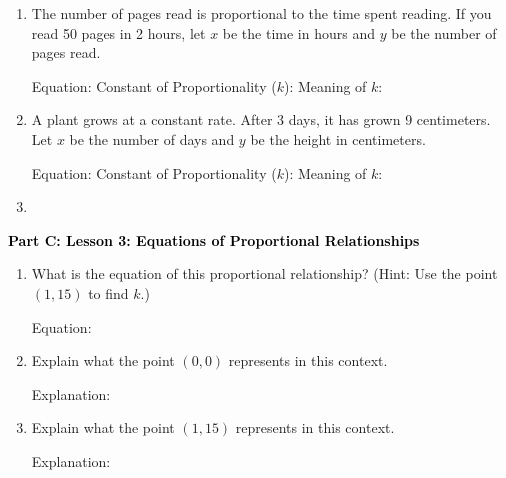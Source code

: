\documentclass[12pt, letterpaper, fleqn]{article}
\newcommand{\blanklong}{\underline{\hspace{6.5cm}}}
\newcommand{\blankshorter}{\underline{\hspace{1.5cm}}}
\begin{document}
\begin{enumerate}[itemsep=5.5cm, leftmargin=0.6cm, resume]
\item The number of pages read is proportional to the time spent reading. If you read 50 pages in 2 hours, let $x$ be the time in hours and $y$ be the number of pages read.
    \begin{tcolorbox}[colback=customteal!10, colframe=customteal!50]
    Equation: \blanklong
    Constant of Proportionality ($k$): \blankshorter
    Meaning of $k$: \blanklong
    \end{tcolorbox}
\item A plant grows at a constant rate. After 3 days, it has grown 9 centimeters. Let $x$ be the number of days and $y$ be the height in centimeters.
    \begin{tcolorbox}[colback=customteal!10, colframe=customteal!50]
    Equation: \blanklong
    Constant of Proportionality ($k$): \blankshorter
    Meaning of $k$: \blanklong
    \end{tcolorbox}
\item [label=\arabic*., itemsep=\fill, leftmargin=0.6cm]
\end{enumerate}

\newpage

\begin{tcolorbox}[colback=customteal!20]
\large\textcolor{black}{\textbf{Part C: Lesson 3: Equations of Proportional Relationships}}
\end{tcolorbox}

\vspace{3mm}

\begin{enumerate}[itemsep=5.5cm, leftmargin=0.6cm, resume]
\item What is the equation of this proportional relationship? (Hint: Use the point $(1, 15)$ to find $k$.)
    \begin{tcolorbox}[colback=customteal!10, colframe=customteal!50]
    Equation: \blanklong
    \end{tcolorbox}
\item Explain what the point $(0, 0)$ represents in this context.
    \begin{tcolorbox}[colback=customteal!10, colframe=customteal!50]
    Explanation: \blanklong
    \end{tcolorbox}
\item Explain what the point $(1, 15)$ represents in this context.
    \begin{tcolorbox}[colback=customteal!10, colframe=customteal!50]
    Explanation: \blanklong
    \end{tcolorbox}
\end{enumerate}
\end{document}
